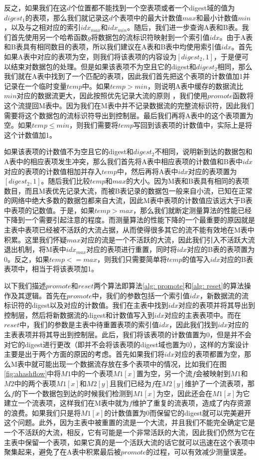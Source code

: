 \documentclass{article}
\begin{document}
反之，如果我们在这$d$个位置都不能找到一个空表项或者一个digest域的值为$digest_1$的表项，那么我们就记录这$d$个表项中的最大计数值$max$和最小计数值$min$，以及与之相对应的索引$idx_{max}$和$idx_{min}$。随后，我们进一步查询A表和B表。我们首先使用另一个哈希函数$g$将数据包的流标识符映射到一个索引值$idx$。由于A表和B表具有相同数目的表项，所以我们建议在A表和B表中均使用索引值$idx$。首先如果A表中对应的表项为空，则我们将该表项的内容设为$[digest_2, 1]$，于是便可以结束对数据包的处理。但是如果该表项不为空且它的digest和$digest_2$相同，那么我们就在A表中找到了一个匹配的表项，因此我们首先把这个表项的计数值加1并记录在一个临时变量$temp$中。如果$temp > min$，则说明A表中缓存的数据流比$min$对应的数据流更大，因此按照优先记录大流的原则 ，我们使用$promote$函数将这个流提回M表中。因为我们在M表中并不记录数据流的完整流标识符，因此我们需要将这个数据包的流标识符导出到控制层。最后我们再将A表中的这个表项置为空。如果$temp \le min$，则我们需要将$temp$写回到该表项的计数值中，实际上是将这个计数值加1。

如果该表项的计数值不为空且它的digest和$digest_2$不相同，说明新到达的数据包和A表中的相应表项发生冲突，那么我们首先将A表中相应表项的计数值和B表中$idx$对应的表项的计数值相加并存入$temp$中，然后再将A表中$idx$对应的表项置为$[digest_2, 1]$。随后我们比较$temp$和$max$的大小。因为M表和B表具有相同的表项数目，而且M表优先记录大流，而被B表记录的数据包一般来自小流，已知在正常的网络中绝大多数的数据包都来自大流，因此M表中表项的计数值应该远大于B表中表项的记数值。于是，如果$temp>max$，那么我们就断定测量算法的性能已经下降到一个需要引起注意的程度。而测量算法的性能下降的一个最重要的原因就是主表中表项已经被不活跃的大流占据，从而使得很多其它的流不能有效地在M表中积累。这里我们怀疑$max$对应的流是一个不活跃的大流，因此我们引入不活跃大流退出机制，将M表中$idx_{max}$对应的表项进行重置，同时将$idx$对应的B表的表项置为0。反之，如果$temp <= max$，则我们只需要简单将$temp$的值写入$idx$对应的B表表项中，相当于将该表项加1。


以下我们描述$promote$和$reset$两个算法即算法\ref{alg: promote}和\ref{alg: reset}的算法操作及其逻辑。首先在$promote$中，我们的参数包括一个索引值$idx$，新数据流的流标识符的digest以及对应的计数值。我们在主表中找到$idx$对应的表项并将其导出到控制层，然后将新数据流的digest和计数值写入到$idx$对应的主表表项中。而在$reset$中，我们的参数是主表中待重置表项的索引值$idx$，因此我们找到$idx$对应的主表表项并将其导出到控制层。此后，我们将该表项的计数值置为0，但是并不会对它的digest进行更改（即并不会将该表项的digest域也置为0），这样的方案设计主要是出于两个方面的原因的考虑。首先如果我们将$idx$对应的表项都置为空，那么M表中就可能出现一个数据流存放在多个表项中的情况，比如我们在图\ref{fig:ahashflow}中将$M1$中的一个表项$M1[x]$置为空，另一个流$f$会被映射到$M1$和$M2$中的两个表项$M1[x]$和$M2[y]$且我们已经为$f$在$M2[y]$维护了一个流表项，那么$f$的下一个数据包到达的时候我们检测到$M1[x]$为空，因此还会在$M1[x]$为它建立一个流表项，这样我们在M表中就为$f$维护了重复的流表项，造成了内存资源的浪费。如果我们只是将$M1[x]$的计数值置为0而保留它的digest就可以完美避开这个问题。此外，因为主表中被重置的流是一个大流，并且我们不能完全确定它是一个不活跃的大流，相反，它有可能是一个非常活跃的大流，因此我们仍然为它在主表中保留一个表项，如果它真的是一个活跃大流的话它就可以迅速在这个表项中聚集起来，避免了在A表中积累最后被$promote$的过程，可以有效减少测量误差。
\end{document}
